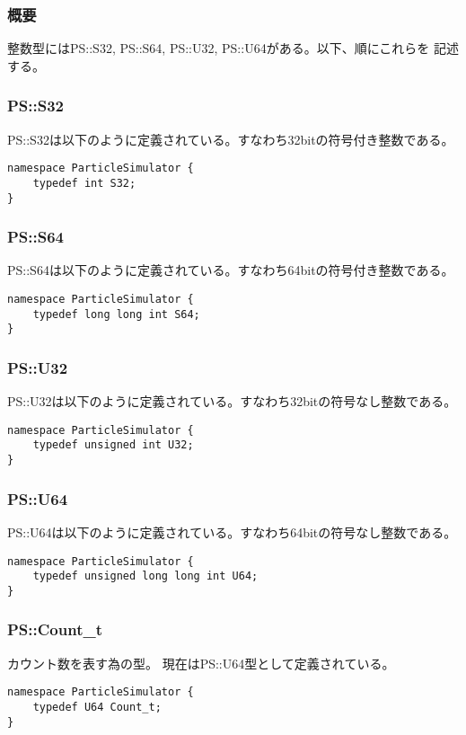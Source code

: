 \subsubsection{概要}

整数型にはPS::S32, PS::S64, PS::U32, PS::U64がある。以下、順にこれらを
記述する。

\subsubsection{PS::S32}

PS::S32は以下のように定義されている。すなわち32bitの符号付き整数である。
\begin{lstlisting}[caption=S32]
namespace ParticleSimulator {
    typedef int S32;
}
\end{lstlisting}


\subsubsection{PS::S64}

PS::S64は以下のように定義されている。すなわち64bitの符号付き整数である。
\begin{lstlisting}[caption=S64]
namespace ParticleSimulator {
    typedef long long int S64;
}
\end{lstlisting}


\subsubsection{PS::U32}

PS::U32は以下のように定義されている。すなわち32bitの符号なし整数である。
\begin{lstlisting}[caption=U32]
namespace ParticleSimulator {
    typedef unsigned int U32;
}
\end{lstlisting}


\subsubsection{PS::U64}

PS::U64は以下のように定義されている。すなわち64bitの符号なし整数である。
\begin{lstlisting}[caption=U64]
namespace ParticleSimulator {
    typedef unsigned long long int U64;
}
\end{lstlisting}


\subsubsection{PS::Count\_t}

カウント数を表す為の型。
現在はPS::U64型として定義されている。
\begin{lstlisting}[caption=Count\_t]
namespace ParticleSimulator {
    typedef U64 Count_t;
}
\end{lstlisting}
